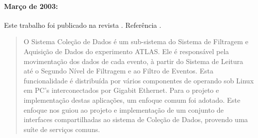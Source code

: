 



\paragraph{Março de 2003: } Este
trabalho foi publicado na revista . Referência \cite{aa:rt-2003}.

\begin{quotation}
O Sistema Coleção de Dados é um sub-sistema do Sistema de Filtragem e
Aquisição de Dados do experimento ATLAS. Ele é responsável pela movimentação
dos dados de cada evento, à partir do Sistema de Leitura até o Segundo Nível
de Filtragem e ao Filtro de Eventos. Esta funcionalidade é distribuída por
vários componentes de  operando sob Linux em PC's
interconectados por Gigabit Ethernet. Para o projeto e implementação destas
aplicações, um enfoque comum foi adotado. Este enfoque nos guiou ao projeto e
implementação de um conjunto de interfaces compartilhadas ao sistema de
Coleção de Dados, provendo uma suíte de serviços comuns.
\end{quotation}

